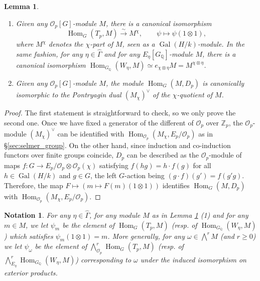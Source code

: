 \documentclass[12pt]{amsart}
\newcommand\bQ{\mathbb{Q}}
\newcommand\Zp{{\mathbb{Z}_p}}
\newcommand\cO{\mathcal{O}}
\DeclareMathOperator{\Gal}{Gal}
\DeclareMathOperator{\Hom}{Hom}
\theoremstyle{defstyle}
\newtheorem{notation}[subsubsection]{Notation}
\theoremstyle{thmstyle}
\newtheorem{lemme}[subsubsection]{Lemma}
\begin{document}
\begin{lemme}\label{lem:identification_Hom(T_p,M)_et_Mchi}\hspace{2em}
\begin{enumerate}
	\item 	Given any $\cO_p[G]$-module $M$, there is a canonical isomorphism 
	$$\Hom_G(T_p,M) \overset{\sim}{\longrightarrow} {M}^\chi, \qquad \psi \mapsto \psi(1\otimes 1),$$
	where ${M}^\chi$ denotes the $\chi$-part of $M$, seen as a $\Gal(H/k)$-module. In the same fashion, for any $\eta\in\widehat{\Gamma}$ and for any $E_\eta[G_{\bQ}]$-module $M$, there is a canonical isomorphism $\Hom_{G_{\bQ}}(W_\eta,M)\simeq e_{\chi \otimes \eta} M = {M}^{\chi\otimes\eta}$.
	\item Given any $\cO_p[G]$-module $M$, the module $\Hom_G(M,D_p)$ is canonically isomorphic to the Pontryagin dual $\left(M_\chi\right)^\vee$ of the $\chi$-quotient of $M$.
\end{enumerate}
\end{lemme}
\begin{proof}
	The first statement is straightforward to check, so we only prove the second one. Once we have fixed a generator of the different of $\cO_p$ over $\Zp$, the $\cO_p$-module $\left(M_\chi\right)^\vee$ can be identified with $\Hom_{\cO_p}(M_\chi,E_p/\cO_p)$ as in \S\ref{sec:selmer_group}. On the other hand, since induction and co-induction functors over finite groups coincide, $D_p$ can be described as the $\cO_p$-module of maps $f : G \longrightarrow E_p/\cO_p \otimes \cO_p(\chi)$ satisfying $f(hg)=h\cdot f(g)$ for all $h\in\Gal(H/k)$ and $g\in G$, the left $G$-action being $(g\cdot f)(g')=f(g'g)$. Therefore, the map $F \mapsto (m \mapsto F(m)(1\otimes 1))$ identifies $\Hom_G(M,D_p)$ with $\Hom_{\cO_p}(M_\chi,E_p/\cO_p)$.
\end{proof}
\begin{notation}\label{nota:m_et_psi_m}
	For any $\eta\in\widehat{\Gamma}$, for any module $M$ as in Lemma \ref{lem:identification_Hom(T_p,M)_et_Mchi} (1) and for any $m\in M$, we  let $\psi_m$ be the element of $\Hom_G(T_p,M)$ (resp. of $\Hom_{G_\bQ}(W_\eta,M)$) which satisfies $\psi_m(1\otimes 1)=m$. More generally, for any $\omega\in {\bigwedge}^r M$ (and $r\geq 0$) we let $\psi_\omega$ be the element of $ {\bigwedge}_{\cO_p}^r \Hom_G(T_p,M)$ (resp. of ${\bigwedge}_{E_\eta}^r \Hom_{G_{\bQ}}(W_\eta,M)$) corresponding to $\omega$ under the induced isomorphism on exterior products.
\end{notation}
\end{document}
